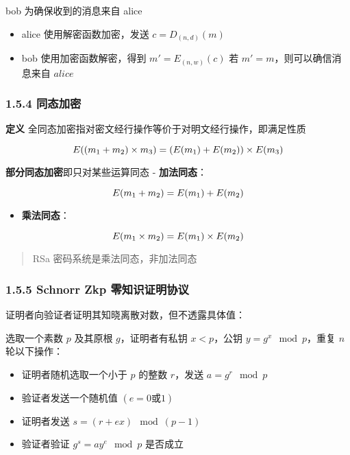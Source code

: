 bob 为确保收到的消息来自 alice

\begin{itemize}
\tightlist
\item
  alice 使用解密函数加密，发送 \(c=D_{(n,d)}(m)\)
\item
  bob 使用加密函数解密，得到 \(m'=E_{(n,w)}(c)\) 若
  \(m'=m\)，则可以确信消息来自 \(alice\)
\end{itemize}

\subsubsection{1.5.4 同态加密}\label{ux540cux6001ux52a0ux5bc6}

\textbf{定义} 全同态加密指对密文经行操作等价于对明文经行操作，即满足性质

\[
\huge
\huge E((m_1+m_2)\times m_3)=(E(m_1)+E(m_2))\times E(m_3)
\]

\textbf{部分同态加密}即只对某些运算同态 - \textbf{加法同态}：

\[
\huge E(m_1+m_2)=E(m_1)+E(m_2)
\]

\begin{itemize}
\tightlist
\item
  \textbf{乘法同态}：
\end{itemize}

\[
\huge E(m_1\times m_2)=E(m_1)\times E(m_2)
\]

\begin{quote}
RSa 密码系统是乘法同态，非加法同态
\end{quote}

\subsubsection{1.5.5 Schnorr Zkp
零知识证明协议}\label{schnorr-zkp-ux96f6ux77e5ux8bc6ux8bc1ux660eux534fux8bae}

证明者向验证者证明其知晓离散对数，但不透露具体值：

选取一个素数 \(p\) 及其原根 \(g\)，证明者有私钥 \(x<p\)，公钥
\(y=g^x\mod{p}\)，重复 \(n\) 轮以下操作：

\begin{itemize}
\tightlist
\item
  证明者随机选取一个小于 \(p\) 的整数 \(r\)，发送 \(a=g^r\mod p\)
\item
  验证者发送一个随机值 \((e=0或1)\)
\item
  证明者发送 \(s=(r+ex)\mod{(p-1)}\)
\item
  验证者验证 \(g^s=ay^e\mod p\) 是否成立
\end{itemize}

